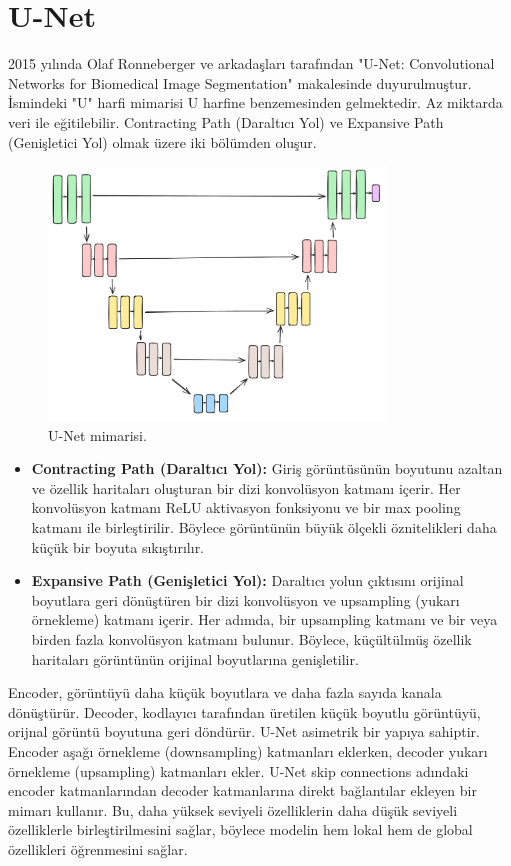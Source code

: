 \section{U-Net}
2015 yılında Olaf Ronneberger ve arkadaşları tarafından "U-Net: Convolutional Networks for Biomedical Image Segmentation" makalesinde duyurulmuştur. İsmindeki "U" harfi mimarisi U harfine benzemesinden gelmektedir. Az miktarda veri ile eğitilebilir. Contracting Path (Daraltıcı Yol) ve Expansive Path (Genişletici Yol) olmak üzere iki bölümden oluşur.

\begin{figure}[ht]
    \centering
    \includegraphics[width=0.8\textwidth]{images/unet_architecture.png}
    \caption{U-Net mimarisi.}
    \label{fig:enter-label}
\end{figure}

\begin{itemize}
    \item \textbf{Contracting Path (Daraltıcı Yol):} Giriş görüntüsünün boyutunu azaltan ve özellik haritaları oluşturan bir dizi konvolüsyon katmanı içerir. Her konvolüsyon katmanı ReLU aktivasyon fonksiyonu ve bir max pooling katmanı ile birleştirilir. Böylece görüntünün büyük ölçekli öznitelikleri daha küçük bir boyuta sıkıştırılır.
    \item \textbf{Expansive Path (Genişletici Yol):} Daraltıcı yolun çıktısını orijinal boyutlara geri dönüştüren bir dizi konvolüsyon ve upsampling (yukarı örnekleme) katmanı içerir. Her adımda, bir upsampling katmanı ve bir veya birden fazla konvolüsyon katmanı bulunur. Böylece, küçültülmüş özellik haritaları görüntünün orijinal boyutlarına genişletilir.
\end{itemize}

Encoder, görüntüyü daha küçük boyutlara ve daha fazla sayıda kanala dönüştürür. Decoder, kodlayıcı tarafından üretilen küçük boyutlu görüntüyü, orijnal görüntü boyutuna geri döndürür. U-Net asimetrik bir yapıya sahiptir. Encoder aşağı örnekleme (downsampling) katmanları eklerken, decoder yukarı örnekleme (upsampling) katmanları ekler. U-Net skip connections adındaki encoder katmanlarından decoder katmanlarına direkt bağlantılar ekleyen bir mimarı kullanır. Bu, daha yüksek seviyeli özelliklerin daha düşük seviyeli özelliklerle birleştirilmesini sağlar, böylece modelin hem lokal hem de global özellikleri öğrenmesini sağlar. 

